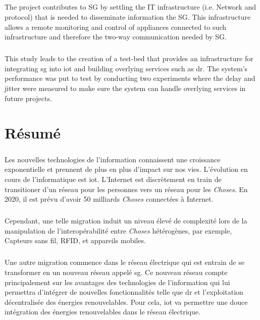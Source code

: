 \documentclass[12pt,a4paper,final]{report}
\begin{document}
\paragraph{}
The project contributes to SG by settling the IT infrastructure  (i.e. Network and protocol) that is needed to disseminate information the SG. This infrastructure allows a remote monitoring and control of appliances connected to such infrastructure and therefore the two-way communication needed by SG.
\paragraph{}
This study leads to the creation of a test-bed that provides an infrastructure for integrating \gls{sg} into \gls{iot} and building overlying services such as \gls{dr}. The system's performance was put to test by conducting two experiments where the delay and jitter were measured to make sure the system can handle overlying services in future projects.

\chapter*{Résumé}
\paragraph{}
Les nouvelles technologies de l'information connaissent une croissance exponentielle et prennent de plus en plus d'impact sur nos vies. L'évolution en cours de l'informatique est \gls{iot}. L'Internet est discrètement en train de transitioner d'un réseau pour les personnes vers un réseau pour les \textit{Choses}. En 2020, il est prévu d'avoir 50 milliards \textit{Choses} connectées à Internet.
\paragraph{}
Cependant, une telle migration induit un niveau élevé de complexité lors de la manipulation de l'interopérabilité entre \textit{Choses} hétérogènes, par exemple, Capteurs sans fil, RFID, et appareils mobiles.
\paragraph{}
Une autre migration commence dans le réseau électrique qui est entrain de se transformer en un nouveau réseau appelé \gls{sg}. Ce nouveau réseau compte principalement sur les avantages des technologies de l'information qui lui permettra d'intégrer de nouvelles fonctionnalités telle que \gls{dr} et l'exploitation décentralisée des énergies renouvelables. Pour cela, \gls{iot} va permettre une douce intégration des énergies renouvelables dans le réseau électrique.
\end{document}
